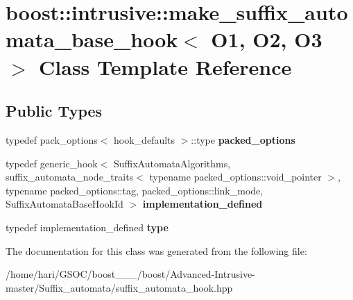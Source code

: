 \hypertarget{classboost_1_1intrusive_1_1make__suffix__automata__base__hook}{}\section{boost\+:\+:intrusive\+:\+:make\+\_\+suffix\+\_\+automata\+\_\+base\+\_\+hook$<$ O1, O2, O3 $>$ Class Template Reference}
\label{classboost_1_1intrusive_1_1make__suffix__automata__base__hook}
\subsection*{Public Types}
\begin{DoxyCompactItemize}
\item 
\mbox{\label{classboost_1_1intrusive_1_1make__suffix__automata__base__hook_af169eb92a361f67464ec4beb9ff5a314}} 
typedef pack\+\_\+options$<$ hook\+\_\+defaults $>$\+::type {\bfseries packed\+\_\+options}
\item 
\mbox{\label{classboost_1_1intrusive_1_1make__suffix__automata__base__hook_a8b3a0f3343ae07dbe98811acc5c67d10}} 
typedef generic\+\_\+hook$<$ Suffix\+Automata\+Algorithms, suffix\+\_\+automata\+\_\+node\+\_\+traits$<$ typename packed\+\_\+options\+::void\+\_\+pointer $>$, typename packed\+\_\+options\+::tag, packed\+\_\+options\+::link\+\_\+mode, Suffix\+Automata\+Base\+Hook\+Id $>$ {\bfseries implementation\+\_\+defined}
\item 
\mbox{\label{classboost_1_1intrusive_1_1make__suffix__automata__base__hook_a3fbc0981de4bc6f6e162259d87cfa3aa}} 
typedef implementation\+\_\+defined {\bfseries type}
\end{DoxyCompactItemize}


The documentation for this class was generated from the following file\+:\begin{DoxyCompactItemize}
\item 
/home/hari/\+G\+S\+O\+C/boost\+\_\+\_\+\_/boost/\+Advanced-\/\+Intrusive-\/master/\+Suffix\+\_\+automata/suffix\+\_\+automata\+\_\+hook.\+hpp\end{DoxyCompactItemize}
